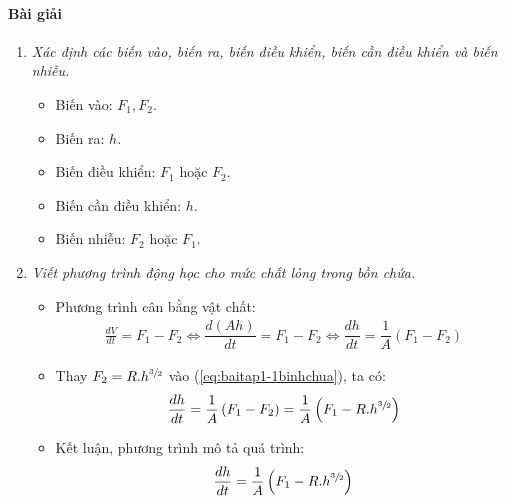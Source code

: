 \paragraph{Bài giải}
    \begin{enumerate}[\it a.]
        \item \textit{Xác định các biến vào, biến ra, biến điều khiển, biến cần điều khiển và biến nhiễu.}
            \begin{itemize}
                \item Biến vào: $F_1, F_2$.
                \item Biến ra: $h$.
                \item Biến điều khiển: $F_1$ hoặc $F_2$.
                \item Biến cần điều khiển: $h$.
                \item Biến nhiễu: $F_2$ hoặc $F_1$.
            \end{itemize}

        \item \textit{Viết phương trình động học cho mức chất lỏng trong bồn chứa.}
            \begin{itemize}
                \item Phương trình cân bằng vật chất:
                    \begin{align} \label{eq:baitap1-1binhchua}
                        \frac{dV}{dt} = F_1 - F_2 \Longleftrightarrow \dfrac{d\left({Ah}\right)}{dt} = F_1 - F_2 \Longleftrightarrow \dfrac{dh}{dt} = \dfrac{1}{A} \left({F_1 - F_2}\right)
                    \end{align}

                \item Thay $F_2 = R.h^{\sfrac{3}{2}}$ vào (\ref{eq:baitap1-1binhchua}), ta có:
                    \begin{align}
                        \dfrac{dh}{dt} = \dfrac{1}{A} \left({F_1 - F_2}\right) = \dfrac{1}{A} \left({F_1 - R.h^{\sfrac{3}{2}}}\right)
                    \end{align}

                \item Kết luận, phương trình mô tả quá trình:
                    \begin{align}
                        \dfrac{dh}{dt} = \dfrac{1}{A} \left({F_1 - R.h^{\sfrac{3}{2}}}\right)
                    \end{align}
            \end{itemize}


\end{enumerate}
